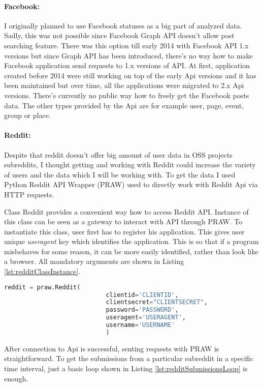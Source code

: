 \paragraph{Facebook:}
I originally planned to use Facebook statuses as a big part of analyzed data. Sadly, this was not possible since Facebook Graph API doesn't allow post searching feature. There was this option till early 2014 with Facebook API 1.x versions but since Graph API has been introduced, there's no way how to make Facebook application send requests to 1.x versions of API. At first, application created before 2014 were still working on top of the early Api versions and it has been maintained but over time, all the applications were migrated to 2.x Api versions. There's currently no public way how to freely get the Facebook posts data. The other types provided by the Api are for example user, page, event, group or place.

\paragraph{Reddit:}
Despite that reddit doesn't offer big amount of user data in OSS projects subreddits, I thought getting and working with Reddit could increase the variety of users and the data which I will be working with. To get the data I used Python Reddit API Wrapper (PRAW) used to directly work with Reddit Api via HTTP requests.

Class Reddit provides a convenient way how to access Reddit API. Instance of this class can be seen as a gateway to interact with API through PRAW. To instantiate this class, user first has to register his application. This gives user unique \textit{useragent} key which identifies the application. This is so that if a program misbehaves for some reason, it can be more easily identified, rather than look like a browser. All mandatory arguments are shown in Listing \ref{lst:redditClassInstance}.

\begin{lstlisting}[caption={Instantiating Reddit class object},label={lst:redditClassInstance},language=Python]
reddit = praw.Reddit(
							clientid='CLIENTID',
							clientsecret="CLIENTSECRET", 				
							password='PASSWORD',
							useragent='USERAGENT',
							username='USERNAME'
							)
\end{lstlisting}

After connection to Api is successful, senting requests with PRAW is straightforward. To get the submissions from a particular subreddit in a specific time interval, just a basic loop shown in Listing \ref{lst:redditSubmissionsLoop} is enough.

